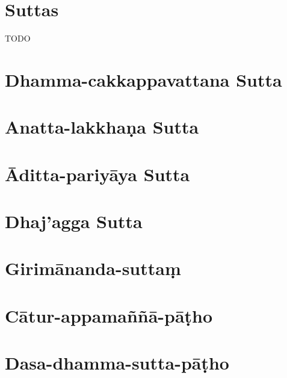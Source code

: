 \chapter{Suttas}

TODO

\chapter{Dhamma-cakkappavattana Sutta}

\chapter{Anatta-lakkhaṇa Sutta}

\chapter{Āditta-pariyāya Sutta}

\chapter{Dhaj’agga Sutta}

\chapter{Girimānanda-suttaṃ}

\chapter{Cātur-appamaññā-pāṭho}

\chapter{Dasa-dhamma-sutta-pāṭho}


